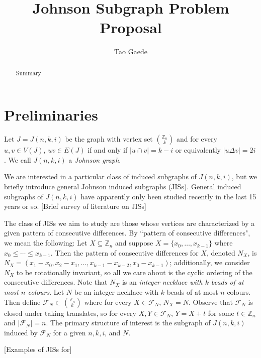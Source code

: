 \documentclass[12]{article}
\title{ \vspace{-3cm} Johnson Subgraph Problem Proposal }
\author{Tao Gaede}
\newcommand{\Z}{\mathbb{Z}}
\theoremstyle{definition}
\begin{document}
	\maketitle
	
	\begin{abstract}
		Summary
	\end{abstract}

	\section{Preliminaries}
	Let $J = J(n,k,i)$ be the graph with vertex set ${\Z_n \choose k}$ and for every $u,v \in V(J)$, $uv \in E(J)$ if and only if $|u \cap v| = k-i$ or equivalently $|u \Delta v| = 2i$.  We call $J(n,k,i)$ a \emph{Johnson graph}.
	
	We are interested in a particular class of induced subgraphs of $J(n,k,i)$, but we briefly introduce general Johnson induced subgraphs (JISs).  General induced subgraphs of $J(n,k,i)$ have apparently only been studied recently in the last 15 years or so. [Brief survey of literature on JISs]
	
	The class of JISs we aim to study are those whose vertices are characterized by a given pattern of consecutive differences.  By ``pattern of consecutive differences", we mean the following: Let $X \subseteq \Z_n$ and suppose $X = \{x_0,\ldots,x_{k-1}\}$ where $x_0 \leq \cdots \leq x_{k-1}$.  Then the pattern of consecutive differences for $X$, denoted $N_X$, is $N_X = (x_1-x_0,x_2-x_1,\ldots,x_{k-1} - x_{k-2}, x_0 - x_{k-1})$; additionally, we consider $N_X$ to be rotationally invariant, so all we care about is the cyclic ordering of the consecutive differences.  Note that $N_X$ is an \emph{integer necklace with $k$ beads of at most $n$ colours}.    Let $N$ be an integer necklace with $k$ beads of at most $n$ colours.  Then define $\mathcal{F}_N \subset {\Z_n \choose k}$ where for every $X \in \mathcal{F}_N$, $N_X = N$.  Observe that $\mathcal{F}_N$ is closed under taking translates, so for every $X,Y \in \mathcal{F}_N$, $Y = X + t$ for some $t \in \Z_n$ and $|\mathcal{F}_N| = n$.  The primary structure of interest is the subgraph of $J(n,k,i)$ induced by $\mathcal{F}_N$ for a given $n,k,i$, and $N$.
	
	[Examples of JISs for]
	
	
\end{document}
